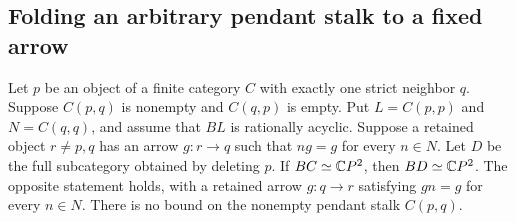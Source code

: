 \subsection{Folding an arbitrary pendant stalk to a fixed arrow}

\begin{theorem}
\label{CP2:A-pendant-arbitrary-stalk-fixed-fold}
Let $p$ be an object of a finite category $C$ with exactly one strict
neighbor $q$. Suppose $C(p,q)$ is nonempty and $C(q,p)$ is empty.
Put $L=C(p,p)$ and $N=C(q,q)$, and assume that $BL$ is rationally
acyclic. Suppose a retained object $r\ne p,q$ has an arrow
$g:r\to q$ such that $ng=g$ for every $n\in N$.
Let $D$ be the full subcategory obtained by deleting $p$.
If $BC\simeq\mathbb{C}P^2$, then $BD\simeq\mathbb{C}P^2$.
The opposite statement holds, with a retained arrow $g:q\to r$
satisfying $gn=g$ for every $n\in N$.
There is no bound on the nonempty pendant stalk $C(p,q)$.
\end{theorem}
